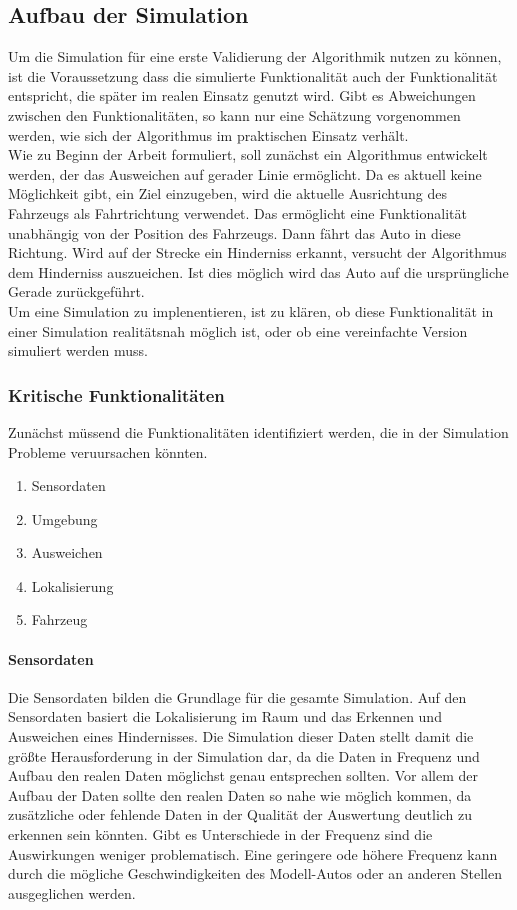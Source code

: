 \subsection{Aufbau der Simulation}
Um die Simulation für eine erste Validierung der Algorithmik nutzen zu können, ist die Voraussetzung dass die simulierte Funktionalität auch der Funktionalität entspricht, die später im realen Einsatz genutzt wird.
Gibt es Abweichungen zwischen den Funktionalitäten, so kann nur eine Schätzung vorgenommen werden, wie sich der Algorithmus im praktischen Einsatz verhält. \\
Wie zu Beginn der Arbeit formuliert, soll zunächst ein Algorithmus entwickelt werden, der das Ausweichen auf gerader Linie ermöglicht. 
Da es aktuell keine Möglichkeit gibt, ein Ziel einzugeben, wird die aktuelle Ausrichtung des Fahrzeugs als Fahrtrichtung verwendet. Das ermöglicht eine Funktionalität unabhängig von der Position des Fahrzeugs. 
Dann fährt das Auto in diese Richtung. Wird auf der Strecke ein Hinderniss erkannt, versucht der Algorithmus dem Hinderniss auszueichen. Ist dies möglich wird das Auto auf die ursprüngliche Gerade zurückgeführt. \\
Um eine Simulation zu implenentieren, ist zu klären, ob diese Funktionalität in einer Simulation realitätsnah möglich ist, oder ob eine vereinfachte Version simuliert werden muss.\\

\subsubsection{Kritische Funktionalitäten}
Zunächst müssend die Funktionalitäten identifiziert werden, die in der Simulation Probleme veruursachen könnten.
\begin{enumerate}
    \item Sensordaten
    \item Umgebung 
    \item Ausweichen
    \item Lokalisierung
    \item Fahrzeug
\end{enumerate}

\paragraph{Sensordaten}
Die Sensordaten bilden die Grundlage für die gesamte Simulation. Auf den Sensordaten basiert die Lokalisierung im Raum und das Erkennen und Ausweichen eines Hindernisses. 
Die Simulation dieser Daten stellt damit die größte Herausforderung in der Simulation dar, da die Daten in Frequenz und Aufbau den realen Daten möglichst genau entsprechen sollten.
Vor allem der Aufbau der Daten sollte den realen Daten so nahe wie möglich kommen, da zusätzliche oder fehlende Daten in der Qualität der Auswertung deutlich zu erkennen sein könnten.
Gibt es Unterschiede in der Frequenz sind die Auswirkungen weniger problematisch. Eine geringere ode höhere Frequenz kann durch die mögliche Geschwindigkeiten des Modell-Autos oder an anderen Stellen ausgeglichen werden.

